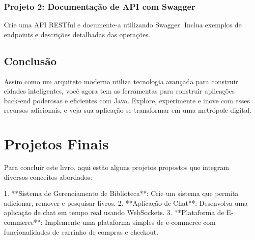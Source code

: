 \documentclass[a4paper,12pt]{book}
\begin{document}
\subsection{Projeto 2: Documentação de API com Swagger}
Crie uma API RESTful e documente-a utilizando Swagger. Inclua exemplos de endpoints e descrições detalhadas das operações.

\section{Conclusão}
Assim como um arquiteto moderno utiliza tecnologia avançada para construir cidades inteligentes, você agora tem as ferramentas para construir aplicações back-end poderosas e eficientes com Java. Explore, experimente e inove com esses recursos adicionais, e veja sua aplicação se transformar em uma metrópole digital.

\chapter{Projetos Finais}
Para concluir este livro, aqui estão alguns projetos propostos que integram diversos conceitos abordados:

1. **Sistema de Gerenciamento de Biblioteca**: Crie um sistema que permita adicionar, remover e pesquisar livros.
2. **Aplicação de Chat**: Desenvolva uma aplicação de chat em tempo real usando WebSockets.
3. **Plataforma de E-commerce**: Implemente uma plataforma simples de e-commerce com funcionalidades de carrinho de compras e checkout.
\end{document}
